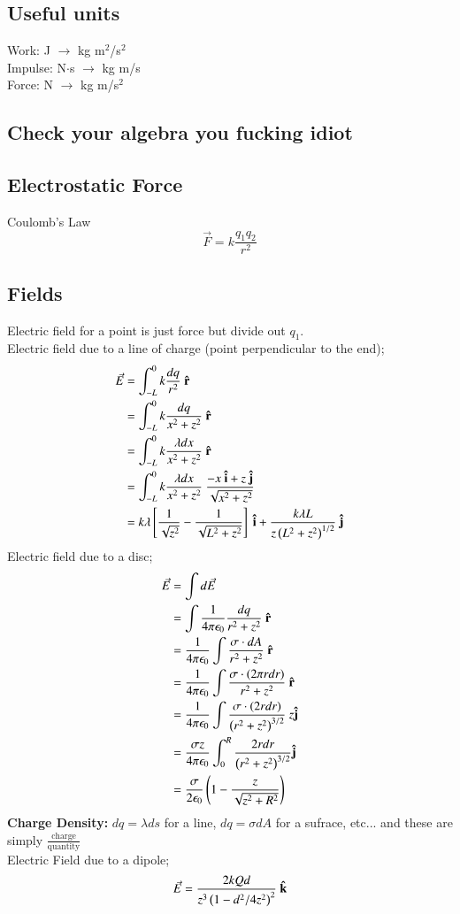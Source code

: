 \documentclass{article}
\begin{document}
\begin{multicols}{2}
\subsection*{Useful units}
Work: J $\rightarrow$ kg m$^2$/s$^2$ \\
Impulse: N$\cdot$s $\rightarrow$ kg m/s \\
Force: N $\rightarrow$ kg m/s$^2$


\subsection*{Check your algebra you fucking idiot}

\subsection*{Electrostatic Force}
Coulomb's Law
\[
	\vec{F} = k\frac{q_1q_2}{r^2}
\]

\subsection*{Fields}
Electric field for a point is just force but divide out $q_1$.\\
Electric field due to a line of charge (point perpendicular to the end);
\begin{align*}
	\vec{E} &= \int_{-L}^0 k \frac{dq}{r^2}\ \vu r\\
			&= \int_{-L}^0 k \frac{dq}{x^2 + z^2}\ \vu r \\
			&= \int_{-L}^0 k \frac{\lambda dx}{x^2+z^2}\ \vu r \\
			&= \int_{-L}^0 k \frac{\lambda dx}{x^2+z^2}\ \frac{-x\ \vu i + z\ \vu j}{\sqrt{x^2+z^2}} \\
			&= k\lambda \left[ \frac{1}{\sqrt{z^2}}-\frac{1}{\sqrt{L^2+z^2}} \right]\ \vu i + \frac{k \lambda L}{z\left(L^2+z^2\right)^{1/2}}\ \vu j
\end{align*}
Electric field due to a disc;
\begin{align*}
	\vec{E} &= \int d\vec{E} \\
			&= \int \frac{1}{4\pi\epsilon_0} \frac{dq}{r^2 + z^2}\ \vu r \\
			&= \frac{1}{4\pi\epsilon_0} \int \frac{\sigma \cdot dA}{r^2+z^2}\ \vu r \\
			&= \frac{1}{4\pi\epsilon_0} \int \frac{\sigma \cdot (2\pi r dr)}{r^2+z^2}\ \vu r \\
			&= \frac{1}{4\pi\epsilon_0} \int \frac{\sigma \cdot (2r dr)}{\left(r^2+z^2\right)^{3/2}}\ z \vu j \\
			&= \frac{\sigma z}{4\pi\epsilon_0} \int_0^R \frac{2r dr}{\left(r^2+z^2\right)^{3/2}} \vu j \\
			&= \frac{\sigma}{2 \epsilon_0} \left(1 - \frac{z}{\sqrt{z^2+R^2}} \right)
\end{align*}
\textbf{Charge Density:} $dq = \lambda ds$ for a line, $dq = \sigma dA$ for a sufrace, etc... and these are simply $\frac{\text{charge}}{\text{quantity}}$ \\
Electric Field due to a dipole;
\[
	\vec{E} = \frac{2kQd}{z^3\left(1-d^2/4z^2\right)^2}\ \vu k
\]


\end{multicols}
\end{document}
